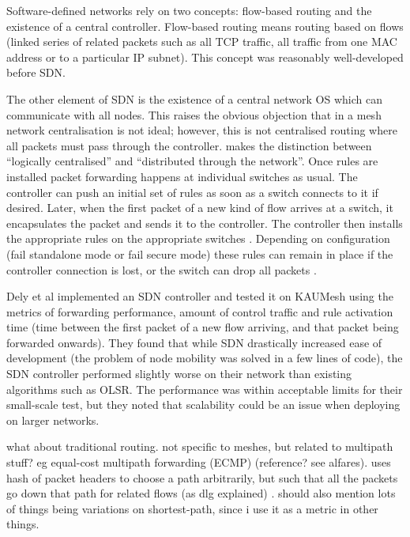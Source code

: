 Software-defined networks rely on two concepts: flow-based routing and the existence of a central controller. Flow-based routing means routing based on flows (linked series of related packets such as all TCP traffic, all traffic from one MAC address or to a particular IP subnet). This concept was reasonably well-developed \cite{wellons:oblivious,wang:routing} before SDN.

The other element of SDN is the existence of a central network OS which can communicate with all nodes. This raises the obvious objection that in a mesh network centralisation is not ideal; however, this is not centralised routing where all packets must pass through the controller. \cite{handigol:asterix} makes the distinction between ``logically centralised'' and ``distributed through the network''. Once rules are installed packet forwarding happens at individual switches as usual. The controller can push an initial set of rules as soon as a switch connects to it if desired. Later, when the first packet of a new kind of flow arrives at a switch, it encapsulates the packet and sends it to the controller. The controller then installs the appropriate rules on the appropriate switches \cite{mckeown:sdn}. Depending on configuration (fail standalone mode or fail secure mode) these rules can remain in place if the controller connection is lost, or the switch can drop all packets \cite{onf:switch140}.

Dely et al \cite{dely:wmn} implemented an SDN controller and tested it on KAUMesh using the metrics of forwarding performance, amount of control traffic and rule activation time (time between the first packet of a new flow arriving, and that packet being forwarded onwards). They found that while SDN drastically increased ease of development (the problem of node mobility was solved in a few lines of code), the SDN controller performed slightly worse on their network than existing algorithms such as OLSR. The performance was within acceptable limits for their small-scale test, but they noted that scalability could be an issue when deploying on larger networks.

what about traditional routing. not specific to meshes, but related to multipath stuff? eg equal-cost multipath forwarding (ECMP) (reference? see alfares). uses hash of packet headers to choose a path arbitrarily, but such that all the packets go down that path for related flows (as dlg explained) \cite{alfares:hedera}. should also mention lots of things being variations on shortest-path, since i use it as a metric in other things.

